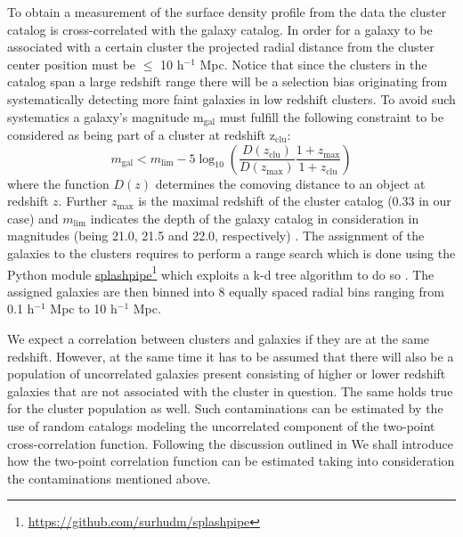 \documentclass[a4paper,fleqn,usenatbib]{mnras}
\newcommand\fnurl[2]{%
  \href{#2}{#1}\footnote{\url{#2}}%
}
\begin{document}
To obtain a measurement of the surface density profile from the data the cluster catalog is cross-correlated with the galaxy catalog. In order for a galaxy to be associated with a certain cluster the projected radial distance from the cluster center position must be  $\leq$ 10 h$^{-1}$ Mpc. Notice that since the clusters in the catalog span a large redshift range there will be a selection bias originating from systematically detecting more faint galaxies in low redshift clusters. To avoid such systematics a galaxy's magnitude m$_{\mathrm{gal}}$ must fulfill the following constraint to be considered as being part of a cluster at redshift z$_{\mathrm{clu}}$:
\begin{equation}
m_{\mathrm{gal}} < m_{\mathrm{lim}} - 5 \log_{10} \left( \frac{D(z_{\mathrm{clu}})}{D(z_{\mathrm{max}})} \frac{1+z_{\mathrm{max}}}{1+z_{\mathrm{clu}}}  \right)
\label{eq:constraint}
\end{equation}
where the function $D(z)$ determines the comoving distance to an object at redshift $z$. Further $z_{\mathrm{max}}$ is the maximal redshift of the cluster catalog (0.33 in our case) and $m_{\mathrm{lim}}$ indicates the depth of the galaxy catalog in consideration in magnitudes (being 21.0, 21.5 and 22.0, respectively) \citep{more2016detection}.
The assignment of the galaxies to the clusters requires to perform a range search which is done using the Python module \fnurl{splashpipe}{https://github.com/surhudm/splashpipe} which exploits a k-d tree algorithm to do so . The assigned galaxies are then binned into 8 equally spaced radial bins ranging from 0.1 h$^{-1}$ Mpc to 10 h$^{-1}$ Mpc.  

We expect a correlation between clusters and galaxies if they are at the same redshift. However, at the same time it has to be assumed that there will also be a population of uncorrelated galaxies present consisting of higher or lower redshift galaxies that are not associated with the cluster in question. The same holds true for the cluster population as well. Such contaminations can be estimated by the use of random catalogs modeling the uncorrelated component of the two-point cross-correlation function. Following the discussion outlined in \citet{kerscher2000comparison} We shall introduce how the two-point correlation function can be estimated taking into consideration the contaminations mentioned above.
\end{document}

